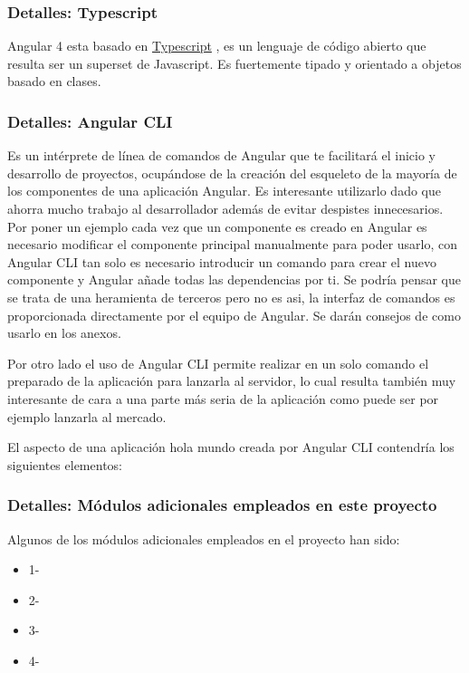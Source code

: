 \subsubsection{Detalles: Typescript}\label{detalle-typescript}
Angular 4 esta basado en  \hyperlink{https://es.wikipedia.org/wiki/TypeScript}{Typescript} , es un lenguaje de código abierto que resulta ser un superset de Javascript. Es fuertemente tipado y orientado a objetos basado en clases.


\subsubsection{Detalles: Angular CLI}\label{detalle-angularcli}
Es un intérprete de línea de comandos de Angular que te facilitará el inicio y desarrollo de proyectos, ocupándose de la creación del esqueleto de la mayoría de los componentes de una aplicación Angular. Es interesante utilizarlo dado que ahorra mucho trabajo al desarrollador además de evitar despistes innecesarios. Por poner un ejemplo cada vez que un componente es creado en Angular es necesario modificar el componente principal manualmente para poder usarlo, con Angular CLI tan solo es necesario introducir un comando para crear el nuevo componente y Angular añade todas las dependencias por ti. Se podría pensar que se trata de una heramienta de terceros pero no es asi, la interfaz de comandos es proporcionada directamente por el equipo de Angular. Se darán consejos de como usarlo en los anexos.

Por otro lado el uso de Angular CLI permite realizar en un solo comando el preparado de la aplicación para lanzarla al servidor, lo cual resulta también muy interesante de cara a una parte más seria de la aplicación como puede ser por ejemplo lanzarla al mercado.

El aspecto de una aplicación hola mundo creada por Angular CLI contendría los siguientes elementos:



\subsubsection{Detalles: Módulos adicionales empleados en este proyecto}\label{detalle-angularmodulos}
Algunos de los módulos adicionales empleados en el proyecto han sido:
\begin{itemize}
\tightlist
\item
1-
\item
2-
\item
3-
  \item
4-
\end{itemize}

